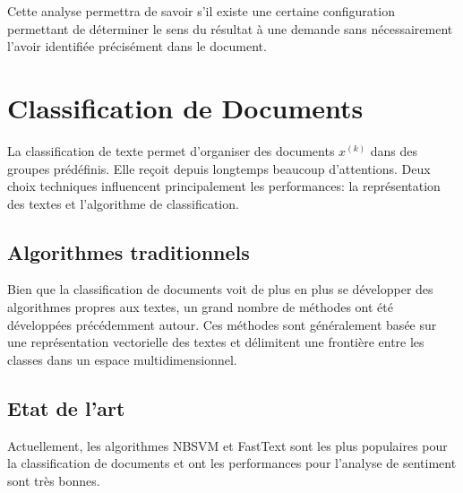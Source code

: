  Cette analyse permettra de savoir s'il existe une certaine configuration permettant de déterminer le sens du résultat à une demande sans nécessairement l'avoir identifiée précisément dans le document. 


\section{Classification de Documents}
\label{sec:sensresultat:biblio_classif}

La classification de texte permet d'organiser des documents $x^{(k)}$ dans des groupes prédéfinis. Elle reçoit depuis longtemps beaucoup d'attentions. Deux choix techniques influencent principalement les performances: la représentation des textes et l'algorithme de classification. 

\subsection{Algorithmes traditionnels}
Bien que la classification de documents voit de plus en plus se développer des algorithmes propres aux textes, un grand nombre de méthodes ont été développées précédemment autour. Ces méthodes sont généralement basée sur une représentation vectorielle des textes et délimitent une frontière entre les classes dans un espace multidimensionnel. 

\subsection{Etat de l'art}
Actuellement, les algorithmes NBSVM et FastText sont les plus populaires pour la classification de documents et ont les performances pour l'analyse de sentiment sont très bonnes. 

